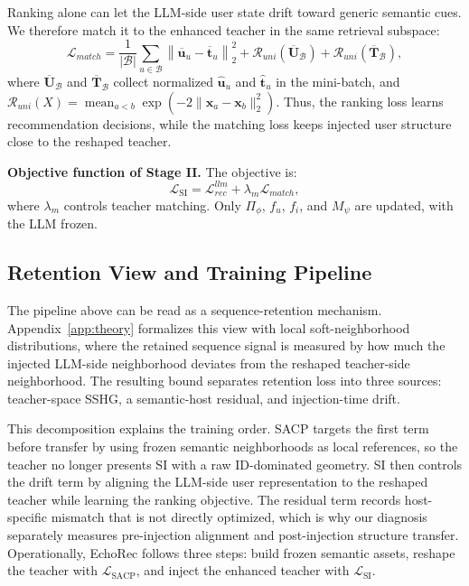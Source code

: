 ﻿\documentclass{article}
\begin{document}
Ranking alone can let the LLM-side user state drift toward generic semantic cues. We therefore match it to the enhanced teacher in the same retrieval subspace:
\begin{equation}
\mathcal{L}_{match}
=
\frac{1}{|\mathcal{B}|}\sum_{u\in\mathcal{B}}
\left\|
\overline{\mathbf{u}}_u-\overline{\mathbf{t}}_u
\right\|_2^2
+\mathcal{R}_{uni}(\overline{\mathbf U}_{\mathcal B})
+\mathcal{R}_{uni}(\overline{\mathbf T}_{\mathcal B}),
\label{eq:stage2_match}
\end{equation}
where $\overline{\mathbf U}_{\mathcal B}$ and $\overline{\mathbf T}_{\mathcal B}$ collect normalized $\hat{\mathbf u}_u$ and $\hat{\mathbf t}_u$ in the mini-batch, and $\mathcal{R}_{uni}(X)=\operatorname{mean}_{a<b}\exp(-2\|\mathbf{x}_a-\mathbf{x}_b\|_2^2)$. Thus, the ranking loss learns recommendation decisions, while the matching loss keeps injected user structure close to the reshaped teacher.

\noindent\textbf{Objective function of Stage II.} The objective is:
\begin{equation}
\mathcal{L}_{\text{SI}}=\mathcal{L}_{rec}^{llm}+\lambda_m\mathcal{L}_{match},
\end{equation}
where $\lambda_m$ controls teacher matching. Only $\Pi_{\phi}$, $f_u$, $f_i$, and $M_{\psi}$ are updated, with the LLM frozen.

\subsection{Retention View and Training Pipeline}
\label{sec:theory}

The pipeline above can be read as a sequence-retention mechanism. Appendix~\ref{app:theory} formalizes this view with local soft-neighborhood distributions, where the retained sequence signal is measured by how much the injected LLM-side neighborhood deviates from the reshaped teacher-side neighborhood. The resulting bound separates retention loss into three sources: teacher-space SSHG, a semantic-host residual, and injection-time drift.

This decomposition explains the training order. SACP targets the first term before transfer by using frozen semantic neighborhoods as local references, so the teacher no longer presents SI with a raw ID-dominated geometry. SI then controls the drift term by aligning the LLM-side user representation to the reshaped teacher while learning the ranking objective. The residual term records host-specific mismatch that is not directly optimized, which is why our diagnosis separately measures pre-injection alignment and post-injection structure transfer. Operationally, EchoRec follows three steps: build frozen semantic assets, reshape the teacher with $\mathcal{L}_{\text{SACP}}$, and inject the enhanced teacher with $\mathcal{L}_{\text{SI}}$.
\end{document}
